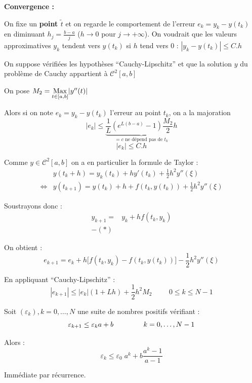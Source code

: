 \textbf{Convergence :}

On fixe un \textbf{point $\tilde{t}$} et on regarde le comportement de l'erreur $e_k = y_k - y(t_k)$
en diminuant $h_j = \displaystyle\frac{b-a}{j}$ ($h \to 0$ pour $j \to + \infty$). On voudrait que
les valeurs approximatives $y_k$ tendent vers $y(t_k)$ si $h$ tend vers 0 :
$| y_k - y(t_k) | \leq C.h$

\begin{ftheo}
    On suppose vérifiées les hypothèses ``Cauchy-Lipschitz'' et que la solution $y$ du problème 
    de Cauchy appartient à $\mathcal{C}^2[a,b]$

    On pose $M_2 = \underset{t\in[a,b]}{\operatorname{Max}} |y''(t)|$

    Alors si on note $e_k = y_k - y(t_k)$ l'erreur au point $t_k$, on a la majoration
    \[
        |e_k| \leq \underbrace{\frac{1}{L} (e^{L(b-a)}-1) \frac{M_2}{2}h}_{\text{$= c$ ne dépend pas de $t_k$}}
    \]
    \[
        |e_k| \leq C.h
    \]
\end{ftheo}

\begin{preuve}
    Comme $y \in \mathcal{C}^2[a,b]$ on a en particulier la formule de Taylor :
    \begin{equation}
        \begin{aligned}
            & y(t_k + h) = y_k(t_k) + h y'(t_k) + \frac{1}{2}h^2 y''(\xi) \\
            \iff & y(t_{k+1}) = y(t_k) + h +f(t_k, y(t_k)) + \frac{1}{2}h^2 y''(\xi)
        \end{aligned}
            \tag{*}
    \end{equation}

    Soustrayons donc :
    \begin{align*}
        y_{k+1} = & y_k + hf(t_k,y_k) \\
        - (*) & 
    \end{align*}

    On obtient :
    \[
        e_{k+1} = e_k + h \Big[ f(t_k,y_k) - f(t_k, y(t_k)) \Big] - \frac{1}{2}h^2 y''(\xi)
    \]

    En appliquant ``Cauchy-Lipschitz'' :
    \begin{equation}
        |e_{k+1}| \leq |e_k| (1 + Lh) + \frac{1}{2}h^2 M_2 \hspace{1cm} 0 \leq k \leq N-1
        \tag{**}
    \end{equation}
\end{preuve}

\begin{lemme}
    Soit $(\varepsilon_k), k=0,\dots,N$ une suite de nombres positifs vérifiant :
    \[
        \varepsilon_{k+1} \leq \varepsilon_k a + b \hspace{1.5cm} k=0,\dots,N-1
    \]

    Alors :
    \[
        \varepsilon_k \leq \varepsilon_0 \; a^k + b \frac{a^k - 1}{a - 1}
    \]
\end{lemme}
\begin{preuve}
    Immédiate par récurrence.
\end{preuve}


